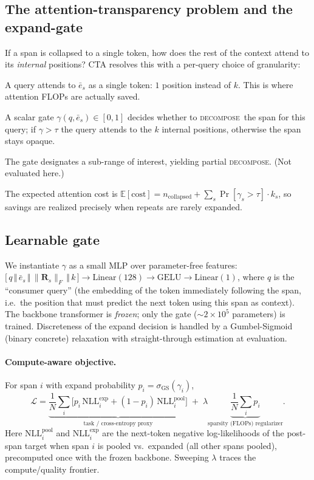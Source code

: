 \documentclass[11pt]{article}
\newcommand{\ebar}{\bar{e}}
\newcommand{\decompose}{\textsc{decompose}}
\newcommand{\R}{\mathbf{R}}
\begin{document}
\subsection{The attention-transparency problem and the expand-gate}
\label{sec:transparency}
If a span is collapsed to a single token, how does the rest of the context attend to its
\emph{internal} positions? CTA resolves this with a per-query choice of granularity:
\begin{description}[leftmargin=1.4em,itemsep=1pt]
  \item[Level 0 --- Opaque (default, cheap).] A query attends to $\ebar_s$ as a single
  token: $1$ position instead of $k$. This is where attention FLOPs are actually saved.
  \item[Level 1 --- Gated expand (on demand).] A scalar gate
  $\gamma(q,\ebar_s)\in[0,1]$ decides whether to \decompose\ the span for this query; if
  $\gamma>\tau$ the query attends to the $k$ internal positions, otherwise the span stays
  opaque.
  \item[Level 2 --- Partial expand.] The gate designates a sub-range of interest, yielding
  partial \decompose. (Not evaluated here.)
\end{description}
The expected attention cost is
$\mathbb{E}[\text{cost}] = n_{\text{collapsed}} + \sum_s \Pr[\gamma_s>\tau]\cdot k_s$,
so savings are realized precisely when repeats are rarely expanded.

\subsection{Learnable gate}
\label{sec:gate-arch}
We instantiate $\gamma$ as a small MLP over parameter-free features:
$\big[\,q \,\Vert\, \ebar_s \,\Vert\, \lVert\R_s\rVert_F \,\Vert\, k\,\big]
\to \text{Linear}(128)\to\text{GELU}\to\text{Linear}(1)$,
where $q$ is the ``consumer query'' (the embedding of the token immediately following the
span, i.e.\ the position that must predict the next token using this span as context). The
backbone transformer is \emph{frozen}; only the gate ($\sim\!2\times10^5$ parameters) is
trained. Discreteness of the expand decision is handled by a Gumbel-Sigmoid (binary
concrete) relaxation with straight-through estimation at evaluation.

\paragraph{Compute-aware objective.}
For span $i$ with expand probability $p_i=\sigma_{\text{GS}}(\gamma_i)$,
\begin{equation}
\label{eq:loss}
\mathcal{L} = \underbrace{\frac{1}{N}\sum_{i}\Big[p_i\,\mathrm{NLL}^{\text{exp}}_i +
(1-p_i)\,\mathrm{NLL}^{\text{pool}}_i\Big]}_{\text{task / cross-entropy proxy}}
\;+\; \lambda \underbrace{\frac{1}{N}\sum_i p_i}_{\text{sparsity (FLOPs) regularizer}} .
\end{equation}
Here $\mathrm{NLL}^{\text{pool}}_i$ and $\mathrm{NLL}^{\text{exp}}_i$ are the next-token
negative log-likelihoods of the post-span target when span $i$ is pooled vs.\ expanded
(all other spans pooled), precomputed once with the frozen backbone. Sweeping $\lambda$
traces the compute/quality frontier.
\end{document}
